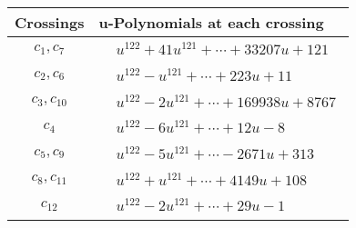 \documentclass[1p]{elsarticle_modified}
\theoremstyle{definition}
\begin{document}
\begin{tabular}{m{50pt}|m{274pt}}
Crossings & \hspace{64pt}u-Polynomials at each crossing \\
\hline $$\begin{aligned}c_{1},c_{7}\end{aligned}$$&$\begin{aligned}
&u^{122}+41 u^{121}+\cdots+33207 u+121
\end{aligned}$\\
\hline $$\begin{aligned}c_{2},c_{6}\end{aligned}$$&$\begin{aligned}
&u^{122}- u^{121}+\cdots+223 u+11
\end{aligned}$\\
\hline $$\begin{aligned}c_{3},c_{10}\end{aligned}$$&$\begin{aligned}
&u^{122}-2 u^{121}+\cdots+169938 u+8767
\end{aligned}$\\
\hline $$\begin{aligned}c_{4}\end{aligned}$$&$\begin{aligned}
&u^{122}-6 u^{121}+\cdots+12 u-8
\end{aligned}$\\
\hline $$\begin{aligned}c_{5},c_{9}\end{aligned}$$&$\begin{aligned}
&u^{122}-5 u^{121}+\cdots-2671 u+313
\end{aligned}$\\
\hline $$\begin{aligned}c_{8},c_{11}\end{aligned}$$&$\begin{aligned}
&u^{122}+u^{121}+\cdots+4149 u+108
\end{aligned}$\\
\hline $$\begin{aligned}c_{12}\end{aligned}$$&$\begin{aligned}
&u^{122}-2 u^{121}+\cdots+29 u-1
\end{aligned}$\\
\hline
\end{tabular}\\~\\
\newpage\renewcommand{\arraystretch}{1}
\end{document}
